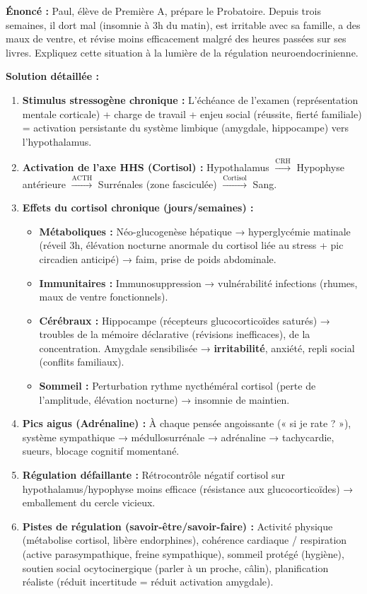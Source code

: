 \documentclass[11pt]{article}
\begin{document}
\begin{exoresolu}
\textbf{Énoncé :} Paul, élève de Première A, prépare le Probatoire. Depuis trois semaines, il dort mal (insomnie à 3h du matin), est irritable avec sa famille, a des maux de ventre, et révise moins efficacement malgré des heures passées sur ses livres. Expliquez cette situation à la lumière de la régulation neuroendocrinienne.

\tcblower

\textbf{Solution détaillée :}
\begin{enumerate}
    \item \textbf{Stimulus stressogène chronique :} L'échéance de l'examen (représentation mentale corticale) + charge de travail + enjeu social (réussite, fierté familiale) = activation persistante du système limbique (amygdale, hippocampe) vers l'hypothalamus.
    \item \textbf{Activation de l'axe HHS (Cortisol) :} Hypothalamus $\xrightarrow{\text{CRH}}$ Hypophyse antérieure $\xrightarrow{\text{ACTH}}$ Surrénales (zone fasciculée) $\xrightarrow{\text{Cortisol}}$ Sang.
    \item \textbf{Effets du cortisol chronique (jours/semaines) :}
    \begin{itemize}
        \item \textbf{Métaboliques :} Néo-glucogenèse hépatique → hyperglycémie matinale (réveil 3h, élévation nocturne anormale du cortisol liée au stress + pic circadien anticipé) → faim, prise de poids abdominale.
        \item \textbf{Immunitaires :} Immunosuppression → vulnérabilité infections (rhumes, maux de ventre fonctionnels).
        \item \textbf{Cérébraux :} Hippocampe (récepteurs glucocorticoïdes saturés) → troubles de la mémoire déclarative (révisions inefficaces), de la concentration. Amygdale sensibilisée → \textbf{irritabilité}, anxiété, repli social (conflits familiaux).
        \item \textbf{Sommeil :} Perturbation rythme nycthéméral cortisol (perte de l'amplitude, élévation nocturne) → insomnie de maintien.
    \end{itemize}
    \item \textbf{Pics aigus (Adrénaline) :} À chaque pensée angoissante (« si je rate ? »), système sympathique → médullosurrénale → adrénaline → tachycardie, sueurs, blocage cognitif momentané.
    \item \textbf{Régulation défaillante :} Rétrocontrôle négatif cortisol sur hypothalamus/hypophyse moins efficace (résistance aux glucocorticoïdes) → emballement du cercle vicieux.
    \item \textbf{Pistes de régulation (savoir-être/savoir-faire) :} Activité physique (métabolise cortisol, libère endorphines), cohérence cardiaque / respiration (active parasympathique, freine sympathique), sommeil protégé (hygiène), soutien social ocytocinergique (parler à un proche, câlin), planification réaliste (réduit incertitude = réduit activation amygdale).
\end{enumerate}
\end{exoresolu}
\end{document}
